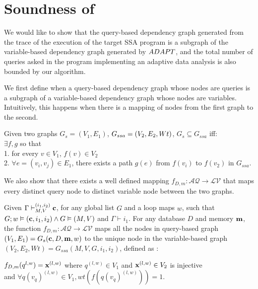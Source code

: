 \section{ Soundness of {\ADAPTSYSTEM}}
\label{sec:adapt-soundness}
We would like to show that the query-based dependency graph generated from the trace of the execution of the target SSA program is a subgraph of the variable-based dependency graph generated by ${ADAPT}$, and the total number of queries asked in the program implementing an adaptive data analysis is also bounded by our algorithm.

We first define when a query-based dependency graph whose nodes are queries is a subgraph of a variable-based dependency graph whose nodes are variables. Intuitively, this happens when there is a mapping of nodes from the first graph to the second.
\begin{defn}
[Subgraph]
Given two graphs $G_{s} = (V_1, E_1)$, $G_{ssa} = (V_2, E_2, \wq{Wt})$, $G_{s} \subseteq G_{ssa}$ iff:\\
$\exists f, g$ so that \\
1. for every $v \in V_1$, $f(v) \in V_2$ 
\\
2. $\forall e=(v_i, v_j) \in E_1$, there exists a path $g(e)$ from $f(v_i)$ to $f(v_2)$ in $G_{ssa}$.
\end{defn}

We also show that there exists a well defined mapping $f_{D,m}: \mathcal{AQ} \to \mathcal{LV}$ that maps every distinct query node to distinct variable node between the two graphs. 

\begin{lem}\label{paper:vetices}
Given $ \Gamma \vdash_{M,V}^{(i_1,i_2)} {\bf{{c}}}$, for any global list $G$ and a loop maps $w$, such that $G ;w \vDash ({\bf{{c}}}, i_1, i_2) \land G \vDash (M,V)$ and $\Gamma \vdash i_1$. For any database $D$ and memory ${\bf{{m}}}$, the function $f_{D,m}: \mathcal{AQ} \to \mathcal{LV}$ maps all the nodes in query-based graph $(V_1, E_1) = G_{s}({\bf{{c}}}, D, {\bf{{m}}},w)$ to the unique node in the variable-based graph $(V_2,E_2, Wt) = G_{ssa}(M,V,G,i_1,i_2)$, defined as :

$f_{D,m}(q^{l,w}) = {\bf{{x}}}^{(l,w)}$ where $q^{(l,w)} \in V_1 $  and ${\bf{{x}}}^{(l,w)} \in V_2$ is injective \\ and $\forall q(v_q)^{(l,w)} \in V_1, wt (f(q(v_q)^{(l,w)}) ) = 1.$
\end{lem}

